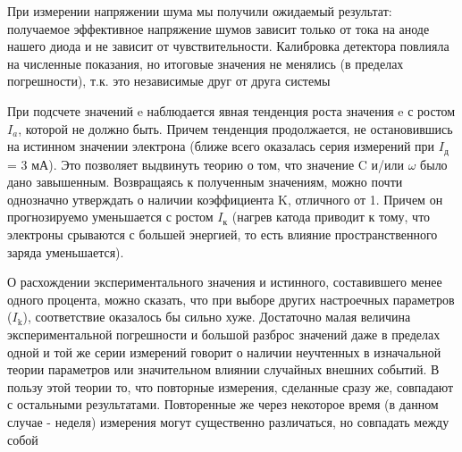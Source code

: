 \documentclass[12pt,a4paper]{article}
\begin{document}
\par При измерении напряжении шума мы получили ожидаемый результат: получаемое эффективное напряжение шумов зависит только от тока на аноде нашего диода и не зависит от чувствительности. Калибровка детектора повлияла на численные показания, но итоговые значения не менялись (в пределах погрешности), т.к. это независимые друг от друга системы

\par При подсчете значений e наблюдается явная тенденция роста значения e с ростом $I_a$, которой не должно быть. Причем тенденция продолжается, не остановившись на истинном значении электрона (ближе всего оказалась серия измерений при $I_\text{д}$ = 3 мА). Это позволяет выдвинуть теорию о том, что значение C и/или $\omega$ было дано завышенным. Возвращаясь к полученным значениям, можно почти однозначно утверждать о наличии коэффициента K, отличного от 1. Причем он прогнозируемо уменьшается с ростом $I_\text{к}$ (нагрев катода приводит к тому, что электроны срываются с большей энергией, то есть влияние пространственного заряда уменьшается). 
\par О расхождении экспериментального значения и истинного, составившего менее одного процента, можно сказать, что при выборе других настроечных параметров ($I_\text{k}$), соответствие оказалось бы сильно хуже. Достаточно малая величина экспериментальной погрешности и большой разброс значений даже в пределах одной и той же серии измерений говорит о наличии неучтенных в изначальной теории параметров или значительном влиянии случайных внешних событий. В пользу этой теории то, что повторные измерения, сделанные сразу же, совпадают с остальными результатами. Повторенные же через некоторое время (в данном случае - неделя) измерения могут существенно различаться, но совпадать между собой
\end{document}
